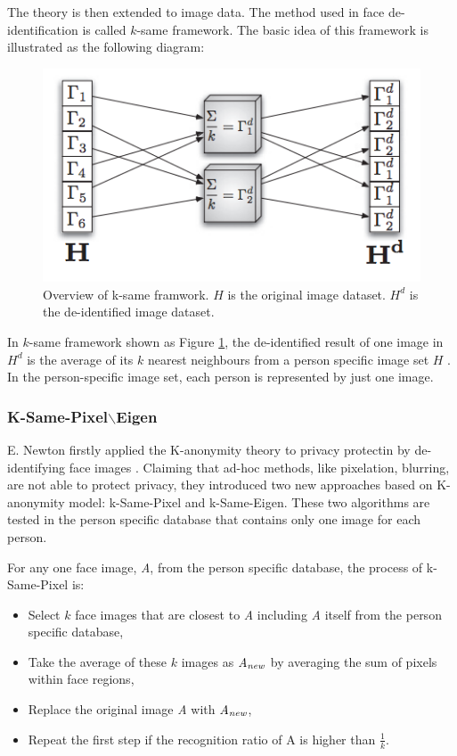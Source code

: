		The theory is then extended to image data. The method used in face 
		de-identification is called $k$-same framework. The basic idea of this framework
		is illustrated as the following diagram:

		\begin{figure}[!htb]
		    \centering
		    \includegraphics[scale=0.8]{figure/k-same}
		    \caption{Overview of k-same framwork. $H$ is the original image dataset. $H^d$
		    	is the de-identified image dataset.}
		    \label{fig:k-same}
	  	\end{figure}

	  	In $k$-same framework shown as Figure \ref{fig:k-same}, the de-identified result 
	  	of one image in $H^d$ is the average of its $k$ nearest neighbours from a person 
	  	specific image set $H$ \cite{faceDeId09}. In the person-specific image set, each 
	  	person is represented by just one image.

	\subsubsection{K-Same-Pixel$\backslash$Eigen}
	
	E. Newton firstly applied the K-anonymity theory to privacy protectin by de-identifying 
	face images \cite{Newton05}. Claiming that ad-hoc methods, like pixelation, blurring, 
	are not able to protect privacy, they introduced two new approaches based on 
	K-anonymity model: k-Same-Pixel and k-Same-Eigen. These two algorithms are 
	tested in the person specific database that contains only one image for each person. 

	For any one face image, {\it A}, from the person specific database, the process 
	of k-Same-Pixel is:
	\begin{itemize}
		\item Select $k$ face images that are closest to {\it A} including {\it A} itself from the person
				specific database,
		\item Take the average of these $k$ images as ${\it A_{new}}$ by averaging the sum of pixels within
				face regions,
		\item Replace the original image {\it A} with ${\it A_{new}}$,
		\item Repeat the first step if the recognition ratio of A is higher than $\frac{1}{k}$.
	\end{itemize}

